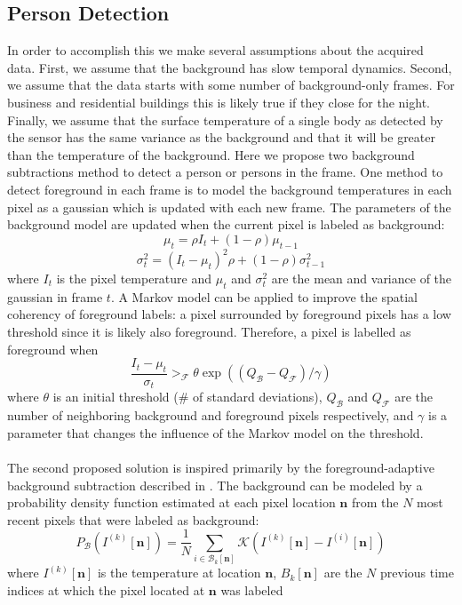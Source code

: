 \documentclass[12pt,oneside]{article} %
\begin{document}
\subsection{Person Detection}
In order to accomplish this
we make several assumptions about the acquired data. First, we assume that the background has slow temporal dynamics.
Second, we assume that the data starts with some number of background-only frames. For business and residential 
buildings this is likely true if they close for the night. Finally, we assume that the surface temperature of a single body as 
detected by the sensor has the same variance as the background and that it will be greater than the temperature
of the background.
Here we propose two background subtractions method to detect a person or persons in the frame. 
One method to detect foreground in each frame is to model the background temperatures in each pixel as a 
gaussian which is updated with each new frame. The parameters of the background model are updated when 
the current pixel is labeled as background:
$$\mu_t = \rho I_t + (1-\rho)\mu_{t-1}$$
$$\sigma_t^2 = (I_t - \mu_t)^2 \rho + (1-\rho)\sigma_{t-1}^2$$
where $I_t$ is the pixel temperature and $\mu_t$ and $\sigma_t^2$ are the mean and variance
of the gaussian in frame $t$. A Markov model can be applied to improve the spatial coherency of foreground labels:
a pixel surrounded by foreground pixels has a low threshold since it is likely also foreground. Therefore,
a pixel is labelled as foreground when
$$\frac{I_t - \mu_t}{\sigma_t} >_\mathcal{F} \theta \exp((Q_\mathcal{B} - Q_\mathcal{F}) / \gamma)$$
where $\theta$ is an initial threshold (\# of standard deviations), $Q_\mathcal{B}$ and $Q_\mathcal{F}$ are the number
of neighboring background and foreground pixels respectively, and $\gamma$ is a parameter that changes 
the influence of the Markov model on the threshold.
\\ \\
The second proposed solution is inspired primarily by the foreground-adaptive background subtraction described in
\cite{Mchugh09}.
The background can be modeled by a probability density function estimated at each pixel location $\mathbf{n}$
from the $N$ most recent pixels that were labeled as background:
$$P_\mathcal{B}\left(I^{(k)} [\mathbf{n}]\right) = \frac{1}{N}\sum_{i \in \mathcal{B}_k[\mathbf{n}]} \mathcal{K}
	\left(I^{(k)}[\mathbf{n}] - I^{(i)}[\mathbf{n}] \right)$$
where 
$I^{(k)}[\mathbf{n}]$ is the temperature at location $\mathbf{n}$,
$B_k[\mathbf{n}]$ are the $N$ previous time indices at which the pixel located at $\mathbf{n}$ was labeled
\end{document}
